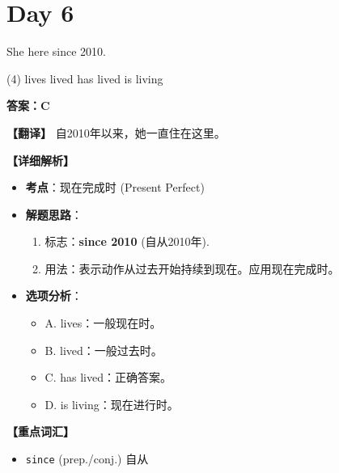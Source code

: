 \documentclass[11pt, a4paper]{article}
\newcommand{\analysis}[4]{
    \begin{solutionbox}
        \textbf{答案：#1}
        
        \textbf{【翻译】} #2
        
        \textbf{【详细解析】}
        #3
        
        \textbf{【重点词汇】}
        #4
    \end{solutionbox}
}
\newcommand{\blank}{\underline{\hspace{1.5cm}}}
\begin{document}
\section*{Day 6}
\begin{questions}
    \item She \blank here since 2010.
    \begin{tasks}(4)
        \task lives \task lived \task has lived \task is living
    \end{tasks}
    \analysis{C}{自2010年以来，她一直住在这里。}{
        \begin{itemize}
            \item \textbf{考点}：现在完成时 (Present Perfect)
            \item \textbf{解题思路}：
                \begin{enumerate}
                    \item 标志：\textbf{since 2010} (自从2010年).
                    \item 用法：表示动作从过去开始持续到现在。应用现在完成时。
                \end{enumerate}
            \item \textbf{选项分析}：
                \begin{itemize}
                    \item A. lives：一般现在时。
                    \item B. lived：一般过去时。
                    \item C. has lived：正确答案。
                    \item D. is living：现在进行时。
                \end{itemize}
        \end{itemize}
    }{
        \begin{itemize}
            \item \texttt{since} (prep./conj.) 自从
        \end{itemize}
    }


\end{questions}
\end{document}
